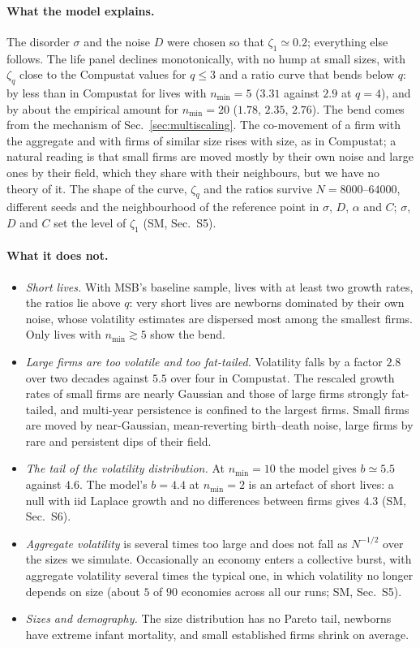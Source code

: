\documentclass[pre,twocolumn,superscriptaddress,nofootinbib]{revtex4-2}
\begin{document}
\paragraph{What the model explains.}  The disorder $\sigma$ and the noise $D$ were chosen so that
$\zeta_1\simeq0.2$; everything else follows.  The life panel declines monotonically, with no hump at small sizes, with $\zeta_q$ close to
the Compustat values for $q\le3$ and a ratio curve that bends below $q$: by less than in Compustat for
lives with $n_{\min}=5$ ($3.31$ against $2.9$ at $q=4$), and by about the empirical amount for $n_{\min}=20$
($1.78$, $2.35$, $2.76$).
The bend comes from the mechanism of Sec.~\ref{sec:multiscaling}.  The co-movement of a firm with the
aggregate and with firms of similar size rises with size, as in Compustat; a natural reading is that
small firms are moved mostly by their own noise and large ones by their field, which they share with
their neighbours, but we have no theory of it.  The shape of the curve, $\zeta_q$ and the ratios survive
$N=8000$--$64000$, different seeds and the neighbourhood of the reference point in $\sigma$, $D$, $\alpha$
and $C$; $\sigma$, $D$ and $C$ set the level of $\zeta_1$ (SM, Sec.~S5).

\paragraph{What it does not.}
\begin{itemize}
\item \emph{Short lives.}  With MSB's baseline sample, lives with at least two growth rates, the
  ratios lie above $q$: very short lives are newborns dominated by their own noise, whose
  volatility estimates are dispersed most among the smallest firms.  Only lives with $n_{\min}\gtrsim5$
  show the bend.
\item \emph{Large firms are too volatile and too fat-tailed.}  Volatility falls by a factor $2.8$
  over two decades against $5.5$ over four in Compustat.  The rescaled growth rates of small firms
  are nearly Gaussian and those of large firms strongly fat-tailed, and multi-year persistence is
  confined to the largest firms.  Small firms are moved by near-Gaussian, mean-reverting birth--death
  noise, large firms by rare and persistent dips of their field.
\item \emph{The tail of the volatility distribution.}  At $n_{\min}=10$ the model gives $b\simeq5.5$
  against $4.6$.  The model's $b=4.4$ at $n_{\min}=2$ is an artefact of short lives: a null with iid
  Laplace growth and no differences between firms gives $4.3$ (SM, Sec.~S6).
\item \emph{Aggregate volatility} is several times too large and does not fall as $N^{-1/2}$ over the
  sizes we simulate.  Occasionally an economy enters a collective burst, with aggregate volatility
  several times the typical one, in which volatility no longer depends on size (about $5$ of $90$
  economies across all our runs; SM, Sec.~S5).
\item \emph{Sizes and demography.}  The size distribution has no Pareto tail, newborns have extreme
  infant mortality, and small established firms shrink on average.
\end{itemize}
\end{document}
